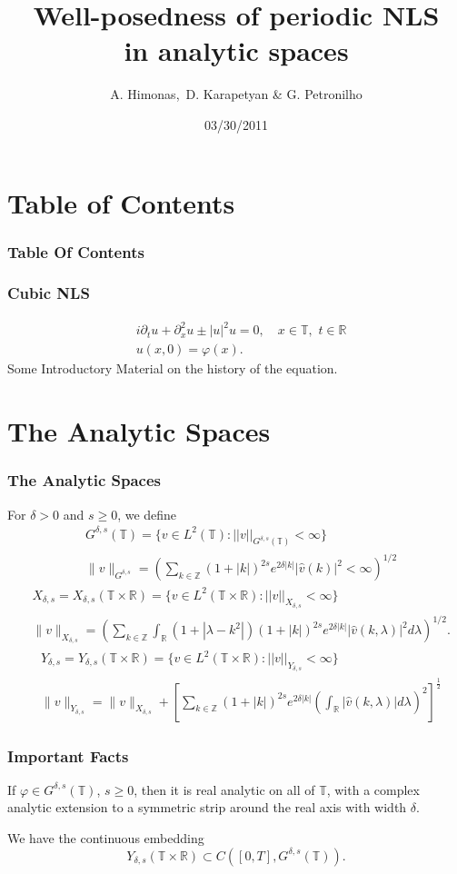 \documentclass{beamer}
\date{03/30/2011}
\title
{ Well-posedness of  periodic NLS  \\in  analytic  spaces}
\author{{A.  Himonas,\, D. Karapetyan   \& G. Petronilho}}
\numberwithin{equation}{section}
\newcommand{\p}{\partial}
\newcommand{\ci}{\mathbb{T}}
\newcommand{\vp}{\varphi}
\begin{document}
\begin{frame}
\titlepage
\end{frame}


\section*{Table of Contents}
\begin{frame}
\frametitle{Table Of Contents}
\tableofcontents
\end{frame}
%
%
\begin{frame}
  \frametitle{Cubic NLS}
%
%
\begin{align*}
	&i \p_t u + \p_x^{2} u \pm
  |u|^2 u =0, \quad x\in \mathbb{T},\,\,t\in \mathbb{R}
		\\
		&u(x,0) = \vp(x).
\end{align*}
%
Some Introductory Material on the history of the equation.
\end{frame}
%
%
\section{The Analytic Spaces}
\begin{frame}
  \frametitle{The Analytic Spaces}
For $\delta >0$ and $s\ge 0$, we define 
\pause
%
%
\begin{align*}
 & G^{\delta,s}(\mathbb{T})=\{v\in L^2(\mathbb{T}):
 ||v||_{G^{\delta,s}(\mathbb{T})}< \infty \}
 \\
 & \| v \|_{G^{\delta,s}}
 =\left( \sum_{k\in \mathbb{Z}} 
 (1+ |k|)^{2s}e^{2\delta|k|}|\widehat{v}(k)|^2<\infty\right)^{1/2}
 \end{align*}
%
%
\pause
\begin{align*}
  & X_{\delta,s}=X_{\delta,s}(\mathbb{T}\times \mathbb{R})=\{v\in L^2(\mathbb{T}\times \mathbb{R}):
||v||_{X_{\delta,s}}<\infty\}
\\
& \| v \|_{X_{\delta,s}}
=\left( \sum_{k\in \mathbb{Z}}\int_{\mathbb{R}}(1+|\lambda
-k^2|)(1+|k|)^{2s}
e^{2\delta |k|}|\widehat{v}(k,\lambda)|^2d\lambda\right)^{1/2}.
\end{align*}
%
\pause
%
\begin{align*}
& Y_{\delta,s}=Y_{\delta,s}(\mathbb{T}\times \mathbb{R})=\{v\in L^2(\mathbb{T}\times \mathbb{R}):
||v||_{Y_{\delta,s}}<\infty\}
\\
& \| v \|_{Y_{\delta,s}}
= \|v \|_{X_{\delta,s}}
+\left [\sum_{k\in \mathbb{Z}}(1+|k|)^{2s}e^{2\delta |k|}
\left (\int_{\mathbb{R}}
|\widehat{v}(k,\lambda)|d\lambda \right)^2 \right]^{\frac{1}{2}} 
\end{align*}
%
\end{frame}
%
%
\begin{frame}
  \frametitle{Important Facts}
      \begin{lemma}
    If $\vp \in G^{\delta,s}(\ci)$, $s \ge 0$,
      then it is real analytic on all of $\ci$, with a complex
  analytic extension to a symmetric strip around the real axis with width $\delta$.
\end{lemma}
  \begin{lemma}We have the continuous embedding
$$Y_{\delta,s}(\mathbb{T}\times \mathbb{R})
\subset C([0,T],G^{\delta,s}(\mathbb{T})).$$
\end{lemma}
\end{frame}
%
%
\end{document}
